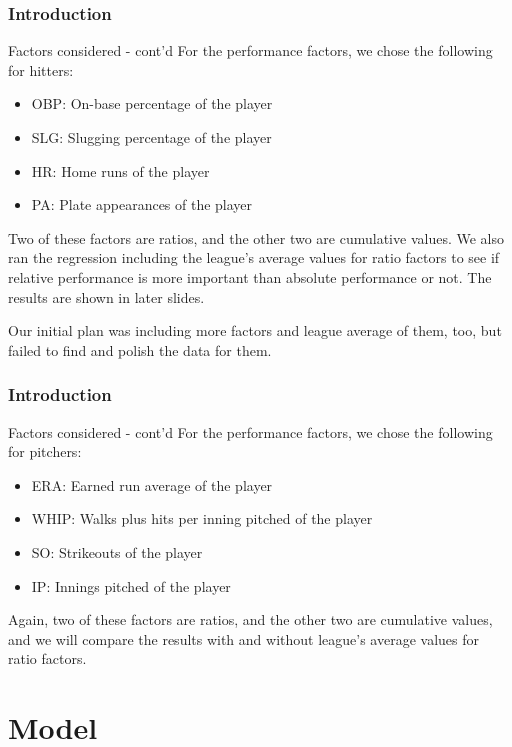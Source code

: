 \documentclass[9pt]{beamer}
\begin{document}
\begin{frame}
    \frametitle{Introduction}
    \begin{block}{Factors considered - cont'd}
        For the performance factors, we chose the following for hitters:
        \begin{itemize}
            \item OBP: On-base percentage of the player
            \item SLG: Slugging percentage of the player
            \item HR: Home runs of the player
            \item PA: Plate appearances of the player
        \end{itemize}
        Two of these factors are ratios, and the other two are cumulative values. We also ran the regression including the league's average values for ratio factors to see if relative performance is more important than absolute performance or not. The results are shown in later slides.
    \end{block}
    Our initial plan was including more factors and league average of them, too, but failed to find and polish the data for them.
\end{frame}
\begin{frame}
    \frametitle{Introduction}
    \begin{block}{Factors considered - cont'd}
        For the performance factors, we chose the following for pitchers:
        \begin{itemize}
            \item ERA: Earned run average of the player
            \item WHIP: Walks plus hits per inning pitched of the player
            \item SO: Strikeouts of the player
            \item IP: Innings pitched of the player
        \end{itemize}
        Again, two of these factors are ratios, and the other two are cumulative values, and we will compare the results with and without league's average values for ratio factors.
    \end{block}
\end{frame}

\section{Model}
\end{document}
